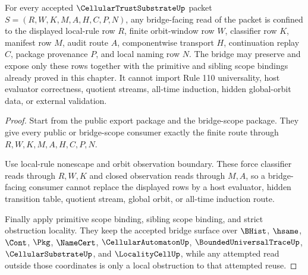 \begin{theorem}
\label{thm:cellular-trust-substrate-standard-bridge-boundary}
For every accepted $\CellularTrustSubstrateUp$ packet $S=(R,W,K,M,A,H,C,P,N)$, any bridge-facing read of the packet is confined to the displayed local-rule row $R$, finite orbit-window row $W$, classifier row $K$, manifest row $M$, audit route $A$, componentwise transport $H$, continuation replay $C$, package provenance $P$, and local naming row $N$. The bridge may preserve and expose only these rows together with the primitive and sibling scope bindings already proved in this chapter. It cannot import Rule 110 universality, host evaluator correctness, quotient streams, all-time induction, hidden global-orbit data, or external validation.
\end{theorem}
\begin{proof}
Start from the public export package and the bridge-scope package. They give every public or bridge-scope consumer exactly the finite route through $R,W,K,M,A,H,C,P,N$.

Use local-rule nonescape and orbit observation boundary. These force classifier reads through $R,W,K$ and closed observation reads through $M,A$, so a bridge-facing consumer cannot replace the displayed rows by a host evaluator, hidden transition table, quotient stream, global orbit, or all-time induction route.

Finally apply primitive scope binding, sibling scope binding, and strict obstruction locality. They keep the accepted bridge surface over $\BHist$, $\hsame$, $\Cont$, $\Pkg$, $\NameCert$, $\CellularAutomatonUp$, $\BoundedUniversalTraceUp$, $\CellularSubstrateUp$, and $\LocalityCellUp$, while any attempted read outside those coordinates is only a local obstruction to that attempted reuse.
\end{proof}

\begin{closurestatus}{\CellularTrustSubstrateUp}
  \theoryclosure{\matureClosure}
  \formalstatus{\axiomCleanV}
\end{closurestatus}
